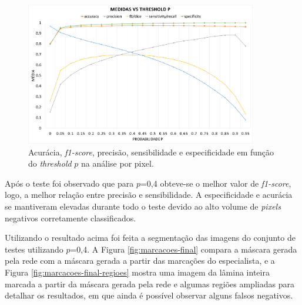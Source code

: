 \begin{figure}
    \center
\includegraphics[width=0.9\textwidth]{figures/4_results/compilado.png}
  
    \caption[Métricas obtidas na análise por pixel.]{Acurácia, \textit{f1-score}, precisão, sensibilidade e especificidade em função do \textit{threshold} $p$ na análise por pixel.}
    \label{fig:graphic-results}
\end{figure}

Após o teste foi observado que para $p$=0,4 obteve-se o melhor valor de \textit{f1-score}, logo, a melhor relação entre precisão e sensibilidade. A especificidade e acurácia se mantiveram elevadas durante todo o teste devido ao alto volume de \textit{pixels} negativos corretamente classificados.

Utilizando o resultado acima foi feita a segmentação das imagens do conjunto de testes utilizando $p$=0,4. A Figura \ref{fig:marcacoes-final} compara a máscara gerada pela rede com a máscara gerada a partir das marcações do especialista, e a Figura \ref{fig:marcacoes-final-regioes} mostra uma imagem da lâmina inteira marcada a partir da máscara gerada pela rede e algumas regiões ampliadas para detalhar os resultados, em que ainda é possível observar alguns falsos negativos.

